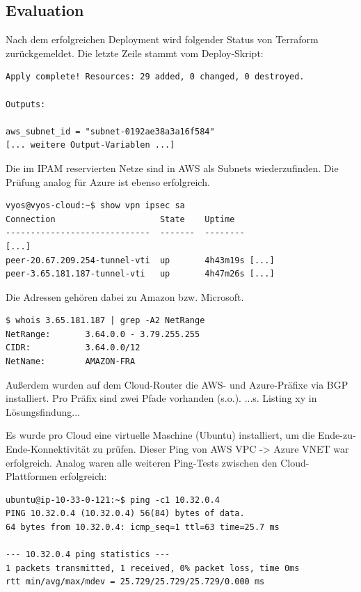 \subsection{Evaluation}
Nach dem erfolgreichen Deployment wird folgender Status von Terraform zurückgemeldet. Die letzte Zeile stammt vom Deploy-Skript:
\begin{lstlisting}[label=tf-base-deployment-ok,caption=Terraform Deployment Status]
Apply complete! Resources: 29 added, 0 changed, 0 destroyed.

Outputs:

aws_subnet_id = "subnet-0192ae38a3a16f584"
[... weitere Output-Variablen ...]
\end{lstlisting}

Die im IPAM reservierten Netze sind in AWS als Subnets wiederzufinden. Die Prüfung analog für Azure ist ebenso erfolgreich.



\begin{lstlisting}[label=tf-base-deployment-ipsec-ok,caption=IPSEC Status]
vyos@vyos-cloud:~$ show vpn ipsec sa
Connection                     State    Uptime
-----------------------------  -------  --------
[...]
peer-20.67.209.254-tunnel-vti  up       4h43m19s [...]
peer-3.65.181.187-tunnel-vti   up       4h47m26s [...]
\end{lstlisting}

Die Adressen gehören dabei zu Amazon bzw. Microsoft.

\begin{lstlisting}[label=whois-amazon-public-ip,caption=Diese Adresse gehört Amazon. Analog wurde geprüft für 20.67.209.254 (Microsoft).]
$ whois 3.65.181.187 | grep -A2 NetRange
NetRange:       3.64.0.0 - 3.79.255.255
CIDR:           3.64.0.0/12
NetName:        AMAZON-FRA
\end{lstlisting}

Außerdem wurden auf dem Cloud-Router die AWS- und Azure-Präfixe via BGP installiert. Pro Präfix sind zwei Pfade vorhanden (s.o.).
...s. Listing xy in Lösungsfindung...

Es wurde pro Cloud eine virtuelle Maschine (Ubuntu) installiert, um die Ende-zu-Ende-Konnektivität zu prüfen. Dieser Ping von AWS VPC -> Azure VNET war erfolgreich. Analog waren alle weiteren Ping-Tests zwischen den Cloud-Plattformen erfolgreich:

\begin{lstlisting}[label=tf-base-deployment-ping-ok,caption=Ping Tests zwischen verschiedenen Cloud-Plattformen]
ubuntu@ip-10-33-0-121:~$ ping -c1 10.32.0.4
PING 10.32.0.4 (10.32.0.4) 56(84) bytes of data.
64 bytes from 10.32.0.4: icmp_seq=1 ttl=63 time=25.7 ms

--- 10.32.0.4 ping statistics ---
1 packets transmitted, 1 received, 0% packet loss, time 0ms
rtt min/avg/max/mdev = 25.729/25.729/25.729/0.000 ms
\end{lstlisting}

